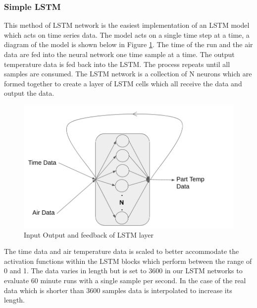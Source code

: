 \subsubsection{Simple LSTM}
 This method of LSTM network is the easiest implementation of an LSTM model which acts on time series data. The model acts on a single time step at a time, a diagram of the model is shown below in Figure \ref{fig:lstm_io}. The time of the run and the air data are fed into the neural network one time sample at a time. The output temperature data is fed back into the LSTM. The process repeats until all samples are consumed. The LSTM network is a collection of N neurons which are formed together to create a layer of LSTM cells which all receive the data and output the data. 
\begin{figure}[h]
    \centering
    \includegraphics[width=.4\linewidth]{lstm/lstm_diagram_io.png}
    \caption{Input Output and feedback of LSTM layer}
    \label{fig:lstm_io}
\end{figure}
The time data and air temperature data is scaled to better accommodate the activation functions within the LSTM blocks which perform between the range of 0 and 1. The data varies in length but is set to 3600 in our LSTM networks to evaluate 60 minute runs with a single sample per second. In the case of the real data which is shorter than 3600 samples data is interpolated to increase its length. 
